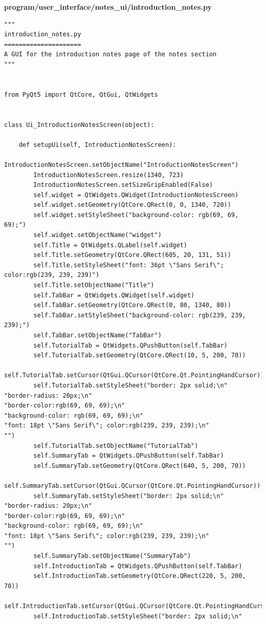 \documentclass{article}
\begin{document}
\textbf{program/user\_interface/notes\_ui/introduction\_notes.py}
\begin{lstlisting}
"""
introduction_notes.py
=====================
A GUI for the introduction notes page of the notes section
"""


from PyQt5 import QtCore, QtGui, QtWidgets


class Ui_IntroductionNotesScreen(object):

    def setupUi(self, IntroductionNotesScreen):
        IntroductionNotesScreen.setObjectName("IntroductionNotesScreen")
        IntroductionNotesScreen.resize(1340, 723)
        IntroductionNotesScreen.setSizeGripEnabled(False)
        self.widget = QtWidgets.QWidget(IntroductionNotesScreen)
        self.widget.setGeometry(QtCore.QRect(0, 0, 1340, 720))
        self.widget.setStyleSheet("background-color: rgb(69, 69, 69);")
        self.widget.setObjectName("widget")
        self.Title = QtWidgets.QLabel(self.widget)
        self.Title.setGeometry(QtCore.QRect(605, 20, 131, 51))
        self.Title.setStyleSheet("font: 36pt \"Sans Serif\"; color:rgb(239, 239, 239)")
        self.Title.setObjectName("Title")
        self.TabBar = QtWidgets.QWidget(self.widget)
        self.TabBar.setGeometry(QtCore.QRect(0, 80, 1340, 80))
        self.TabBar.setStyleSheet("background-color: rgb(239, 239, 239);")
        self.TabBar.setObjectName("TabBar")
        self.TutorialTab = QtWidgets.QPushButton(self.TabBar)
        self.TutorialTab.setGeometry(QtCore.QRect(10, 5, 200, 70))
        self.TutorialTab.setCursor(QtGui.QCursor(QtCore.Qt.PointingHandCursor))
        self.TutorialTab.setStyleSheet("border: 2px solid;\n"
"border-radius: 20px;\n"
"border-color:rgb(69, 69, 69);\n"
"background-color: rgb(69, 69, 69);\n"
"font: 18pt \"Sans Serif\"; color:rgb(239, 239, 239);\n"
"")
        self.TutorialTab.setObjectName("TutorialTab")
        self.SummaryTab = QtWidgets.QPushButton(self.TabBar)
        self.SummaryTab.setGeometry(QtCore.QRect(640, 5, 200, 70))
        self.SummaryTab.setCursor(QtGui.QCursor(QtCore.Qt.PointingHandCursor))
        self.SummaryTab.setStyleSheet("border: 2px solid;\n"
"border-radius: 20px;\n"
"border-color:rgb(69, 69, 69);\n"
"background-color: rgb(69, 69, 69);\n"
"font: 18pt \"Sans Serif\"; color:rgb(239, 239, 239);\n"
"")
        self.SummaryTab.setObjectName("SummaryTab")
        self.IntroductionTab = QtWidgets.QPushButton(self.TabBar)
        self.IntroductionTab.setGeometry(QtCore.QRect(220, 5, 200, 70))
        self.IntroductionTab.setCursor(QtGui.QCursor(QtCore.Qt.PointingHandCursor))
        self.IntroductionTab.setStyleSheet("border: 2px solid;\n"

\end{lstlisting}
\end{document}
